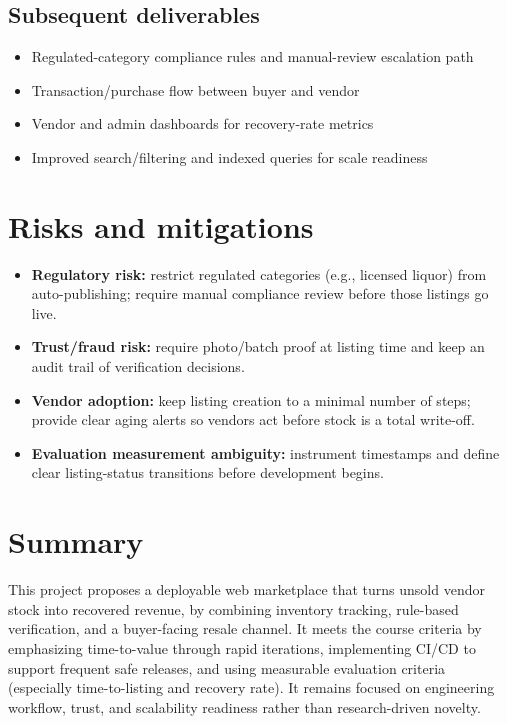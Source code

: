 \documentclass[11pt,a4paper]{article}
\begin{document}
\subsection{Subsequent deliverables}
\begin{itemize}[leftmargin=0.7cm]
    \item Regulated-category compliance rules and manual-review escalation path
    \item Transaction/purchase flow between buyer and vendor
    \item Vendor and admin dashboards for recovery-rate metrics
    \item Improved search/filtering and indexed queries for scale readiness
\end{itemize}

\section{Risks and mitigations}
\begin{itemize}[leftmargin=0.7cm]
    \item \textbf{Regulatory risk:} restrict regulated categories (e.g., licensed liquor) from auto-publishing; require manual compliance review before those listings go live.
    \item \textbf{Trust/fraud risk:} require photo/batch proof at listing time and keep an audit trail of verification decisions.
    \item \textbf{Vendor adoption:} keep listing creation to a minimal number of steps; provide clear aging alerts so vendors act before stock is a total write-off.
    \item \textbf{Evaluation measurement ambiguity:} instrument timestamps and define clear listing-status transitions before development begins.
\end{itemize}

\section{Summary}
This project proposes a deployable web marketplace that
turns unsold vendor stock into recovered revenue, by
combining inventory tracking, rule-based verification,
and a buyer-facing resale channel. It meets the course
criteria by emphasizing time-to-value through rapid
iterations, implementing CI/CD to support frequent safe
releases, and using measurable evaluation criteria
(especially time-to-listing and recovery rate). It
remains focused on engineering workflow, trust, and
scalability readiness rather than research-driven
novelty.
\end{document}
